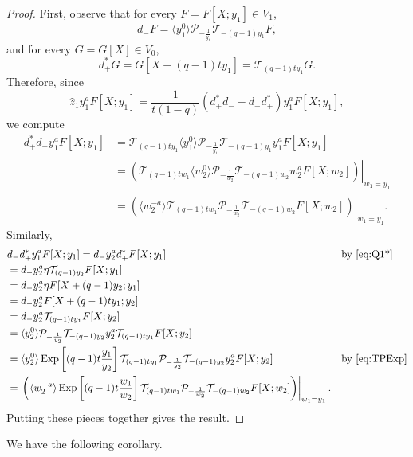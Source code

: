 \documentclass[reqno]{amsart}
\theoremstyle{plain}
\theoremstyle{definition}
\theoremstyle{remark}
\DeclareMathOperator{\Exp}{Exp}
\newcommand{\z}{\widehat{z}}
\newcommand{\<}{\langle}
\renewcommand{\>}{\rangle}
\begin{document}
\begin{proof}
    First, observe that for every $F = F[X;y_1]\in V_1$,
    \[ d_- F =\langle y_1^0 \rangle\mathcal{P}_{-\frac{1}{y_1}} \mathcal{T}_{-(q-1)y_1}F, \]
    and for every $G = G[X] \in V_0$,
    \[ d_+^* G = G[X + (q-1) t y_1] = \mathcal{T}_{(q-1)t y_1} G. \]
    Therefore, since
    \[ \z_1 y_1^a F[X;y_1] = \frac{1}{t(1-q)}(d_+^*d_- - d_- d_+^*) y_1^a F[X;y_1], \]
    we compute
    \begin{align*}
        d_+^*d_- y_1^a F[X;y_1] & = \mathcal{T}_{(q-1)t y_1} \langle y_1^0 \rangle\mathcal{P}_{-\frac{1}{y_1}} \mathcal{T}_{-(q-1)y_1} y_1^a F[X;y_1] \\
        & = \left. \left(\mathcal{T}_{(q-1)t w_1} \langle w_2^0 \rangle\mathcal{P}_{-\frac{1}{w_2}} \mathcal{T}_{-(q-1)w_2} w_2^a F[X;w_2]\right) \right\rvert_{w_1=y_1} \\
        & = \left. \left(\langle w_2^{-a} \rangle \mathcal{T}_{(q-1)t w_1} \mathcal{P}_{-\frac{1}{w_2}} \mathcal{T}_{-(q-1)w_2}F[X;w_2]\right) \right\rvert_{w_1=y_1}.
    \end{align*}
    Similarly,
    \begin{align*}
        & d_-d_+^* y_1^a F[X;y_1] = d_- y_2^a d_+^* F[X;y_1] && \text{by \eqref{eq:Q1*}} \\
        & = d_- y_2^a \eta \mathcal{T}_{(q-1) y_2} F[X;y_1] \\
        & = d_- y_2^a \eta F[X+(q-1) y_2;y_1] \\
        & = d_- y_2^a  F[X+(q-1) ty_1;y_2] \\
        & = d_- y_2^a  \mathcal{T}_{(q-1)t y_1}F[X;y_2] \\
        & = \langle y_2^0\rangle \mathcal{P}_{-\frac{1}{y_2}} \mathcal{T}_{-(q-1)y_2} y_2^a \mathcal{T}_{(q-1)t y_1}F[X;y_2] \\
        & =\langle y_2^0\rangle \Exp\left[(q-1)t\frac{y_1}{y_2}\right]\mathcal{T}_{(q-1)t y_1} \mathcal{P}_{-\frac{1}{y_2}} \mathcal{T}_{-(q-1)y_2} y_2^a F[X;y_2] && \text{by \eqref{eq:TPExp}} \\
        & = \left. \left(\langle w_2^{-a} \rangle \Exp\left[(q-1)t\frac{w_1}{w_2}\right] \mathcal{T}_{(q-1)t w_1} \mathcal{P}_{-\frac{1}{w_2}} \mathcal{T}_{-(q-1)w_2} F[X;w_2]\right) \right\rvert_{w_1=y_1}.
    \end{align*}
    Putting these pieces together gives the result.
\end{proof}

We have the following corollary.
\end{document}
